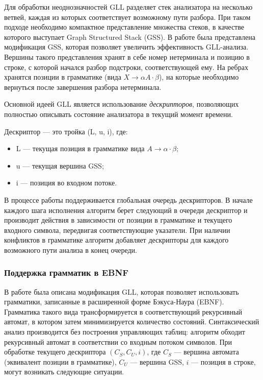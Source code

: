 Для обработки неоднозначностей GLL разделяет стек анализатора на несколько ветвей, каждая из которых соответствует возможному пути разбора. При таком подходе необходимо компактное представление множества стеков, в качестве которого выступает Graph Structured Stack (GSS). В работе \cite{Afroozeh2015gss} была представлена модификация GSS, которая позволяет увеличить эффективность GLL-анализа. Вершины такого представления хранят в себе номер нетерминала и позицию в строке, с которой начался разбор подстроки, соответствующей ему. На ребрах хранятся позиции в грамматике (вида $X \rightarrow \alpha A \cdot \beta$), на которые необходимо вернуться после завершения разбора нетерминала. 

Основной идеей GLL является использование \textit{дескрипторов}, позволяющих полностью описывать состояние анализатора в текущий момент времени.

\begin{defn}
	Дескриптор --- это тройка (L, u, i), где:
	\begin{itemize}
		\setlength\itemsep{0em}
		\item L --- текущая позиция в грамматике вида $A \rightarrow \alpha \cdot \beta$;
		\item u --- текущая вершина GSS;
		\item i --- позиция во входном потоке.
	\end{itemize}
\end{defn}  

В процессе работы поддерживается глобальная очередь дескрипторов. В начале каждого шага исполнения алгоритм берет следующий в очереди дескриптор и производит действия в зависимости от позиции в грамматике и текущего входного символа, передвигая соответствующие указатели. 
При наличии конфликтов в грамматике алгоритм добавляет дескрипторы для каждого возможного пути анализа в конец очереди.

\subsubsection{Поддержка грамматик в EBNF}

В работе \cite{Gorokhov2017ebnf} была описана модификация GLL, которая позволяет использовать грамматики, записанные в расширенной форме Бэкуса-Наура (EBNF). Грамматика такого вида трансформируется в соответствующий рекурсивный автомат, в котором затем минимизируется количество состояний. Синтаксический анализ производится без построения управляющих таблиц: алгоритм обходит рекурсивный автомат в соответствии со входным потоком символов. При обработке текущего дескриптора $(C_S, C_U, i)$, где $C_S$ --- вершина автомата (эквивалент позиции в грамматике), $C_U$ --- вершина GSS, $i$ --- позиция в строке, могут возникать следующие ситуации.

